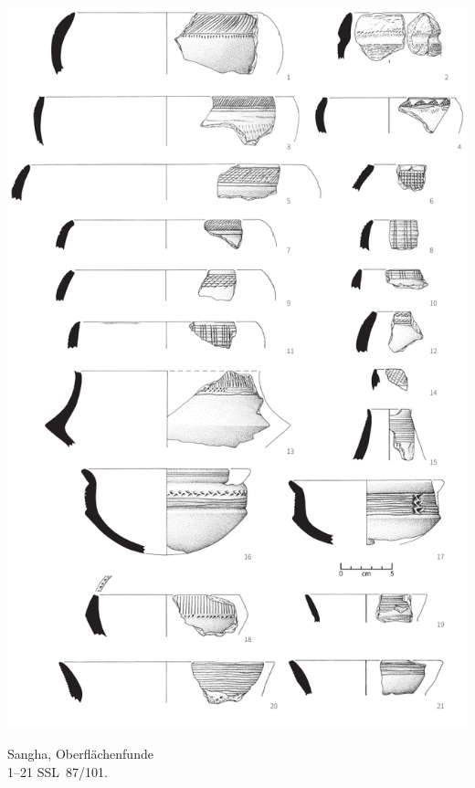 \begin{pl}[H]
	\includegraphics{plt/Taf36.pdf}
	\vspace{.75em}\caption{\mbox{Sangha}, Oberflächenfunde \\ 1--21 SSL~87/101.}
	\label{pl:36}
\end{pl}

